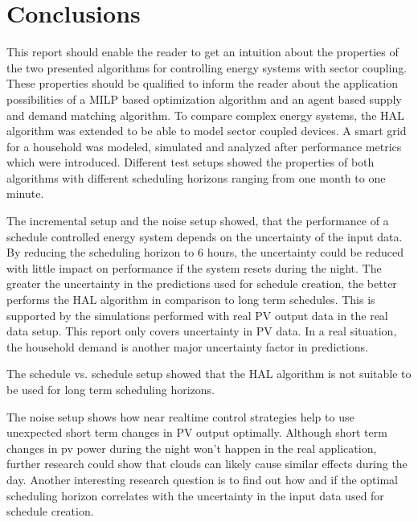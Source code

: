 \documentclass[a4paper,12pt]{book}
\theoremstyle{break}
\begin{document}


\chapter{Conclusions}\label{ch/conclusion}
This report should enable the reader to get an intuition about the properties of the two presented algorithms for controlling energy systems with sector coupling. 
These properties should be qualified to inform the reader about the application possibilities of a \ac{MILP} based optimization algorithm and an agent based supply and demand matching algorithm.
To compare complex energy systems, the HAL algorithm was extended to be able to model sector coupled devices.
A smart grid for a household was modeled, simulated and analyzed after performance metrics which were introduced.
Different test setups showed the properties of both algorithms with different scheduling horizons ranging from one month to one minute.

The incremental setup and the noise setup showed, that the performance of a schedule controlled energy system depends on the uncertainty of the input data.
By reducing the scheduling horizon to 6 hours, the uncertainty could be reduced with little impact on performance if the system resets during the night.
The greater the uncertainty in the predictions used for schedule creation, the better performs the HAL algorithm in comparison to long term schedules.
This is supported by the simulations performed with real \ac{PV} output data in the real data setup. This report only covers uncertainty in \ac{PV} data. In a real situation, the household demand is another major uncertainty factor in predictions.

The schedule vs. schedule setup showed that the HAL algorithm is not suitable to be used for long term scheduling horizons.

The noise setup shows how near realtime control strategies help to use unexpected short term changes in \ac{PV} output optimally. Although short term changes in pv power during the night won't happen in the real application, further research could show that clouds can likely cause similar effects during the day.
Another interesting research question is to find out how and if the optimal scheduling horizon correlates with the uncertainty in the input data used for schedule creation.




\clearpage


\thispagestyle{empty}
\end{document}
